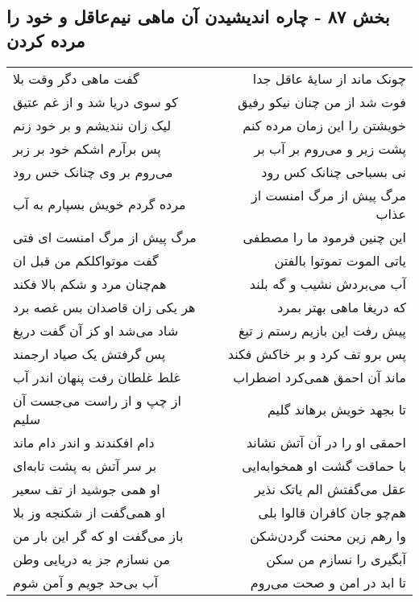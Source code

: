 \begin{center}
\section*{بخش ۸۷ - چاره اندیشیدن آن ماهی نیم‌عاقل و خود را مرده کردن}
\label{sec:sh087}
\begin{longtable}{l p{0.5cm} r}
گفت ماهی دگر وقت بلا
&&
چونک ماند از سایهٔ عاقل جدا
\\
کو سوی دریا شد و از غم عتیق
&&
فوت شد از من چنان نیکو رفیق
\\
لیک زان نندیشم و بر خود زنم
&&
خویشتن را این زمان مرده کنم
\\
پس برآرم اشکم خود بر زبر
&&
پشت زیر و می‌روم بر آب بر
\\
می‌روم بر وی چنانک خس رود
&&
نی بسباحی چنانک کس رود
\\
مرده گردم خویش بسپارم به آب
&&
مرگ پیش از مرگ امنست از عذاب
\\
مرگ پیش از مرگ امنست ای فتی
&&
این چنین فرمود ما را مصطفی
\\
گفت موتواکلکم من قبل ان
&&
یاتی الموت تموتوا بالفتن
\\
هم‌چنان مرد و شکم بالا فکند
&&
آب می‌بردش نشیب و گه بلند
\\
هر یکی زان قاصدان بس غصه برد
&&
که دریغا ماهی بهتر بمرد
\\
شاد می‌شد او کز آن گفت دریغ
&&
پیش رفت این بازیم رستم ز تیغ
\\
پس گرفتش یک صیاد ارجمند
&&
پس برو تف کرد و بر خاکش فکند
\\
غلط غلطان رفت پنهان اندر آب
&&
ماند آن احمق همی‌کرد اضطراب
\\
از چپ و از راست می‌جست آن سلیم
&&
تا بجهد خویش برهاند گلیم
\\
دام افکندند و اندر دام ماند
&&
احمقی او را در آن آتش نشاند
\\
بر سر آتش به پشت تابه‌ای
&&
با حماقت گشت او همخوابه‌ایی
\\
او همی جوشید از تف سعیر
&&
عقل می‌گفتش الم یاتک نذیر
\\
او همی‌گفت از شکنجه وز بلا
&&
هم‌چو جان کافران قالوا بلی
\\
باز می‌گفت او که گر این بار من
&&
وا رهم زین محنت گردن‌شکن
\\
من نسازم جز به دریایی وطن
&&
آبگیری را نسازم من سکن
\\
آب بی‌حد جویم و آمن شوم
&&
تا ابد در امن و صحت می‌روم
\\
\end{longtable}
\end{center}
